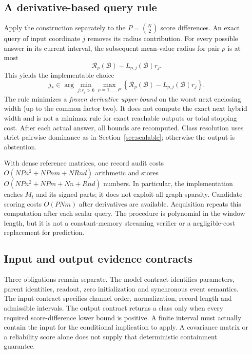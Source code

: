 \documentclass[11pt,a4paper]{article}
\theoremstyle{definition}\newtheorem{definition}[theorem]{Definition}
\begin{document}
\subsection{A derivative-based query rule}
Apply the construction separately to the $P=\binom K2$ score differences. An exact query of input coordinate $j$ removes its radius contribution. For every possible answer in its current interval, the subsequent mean-value radius for pair $p$ is at most
\[
 \mathcal R_p(\mathcal B)-L_{p,j}(\mathcal B)r_j.
\]
This yields the implementable choice
\begin{equation}
 j_*\in\arg\min_{j:r_j>0}\max_{p=1,\ldots,P}
       \left\{\mathcal R_p(\mathcal B)-L_{p,j}(\mathcal B)r_j\right\}.
 \label{eq:observerquery}
\end{equation}
The rule minimizes a \emph{frozen derivative upper bound} on the worst next enclosing width (up to the common factor two). It does not compute the exact next hybrid width and is not a minimax rule for exact reachable outputs or total stopping cost. After each actual answer, all bounds are recomputed. Class resolution uses strict pairwise dominance as in Section~\ref{sec:scalable}; otherwise the output is abstention.

With dense reference matrices, one record audit costs $O(NPn^2+NPnm+NRnd)$ arithmetic and stores $O(NPn^2+NPm+Nn+Rnd)$ numbers. In particular, the implementation caches $M_t$ and its signed parts; it does not exploit all graph sparsity. Candidate scoring costs $O(PNm)$ after derivatives are available. Acquisition repeats this computation after each scalar query. The procedure is polynomial in the window length, but it is not a constant-memory streaming verifier or a negligible-cost replacement for prediction.

\subsection{Input and output evidence contracts}
Three obligations remain separate. The model contract identifies parameters, parent identities, readout, zero initialization and synchronous event semantics. The input contract specifies channel order, normalization, record length and admissible intervals. The output contract returns a class only when every required score-difference lower bound is positive. A finite interval must actually contain the input for the conditional implication to apply. A covariance matrix or a reliability score alone does not supply that deterministic containment guarantee.
\end{document}
